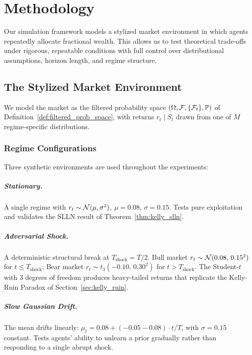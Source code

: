 \chapter{Methodology}
\label{ch:methodology}

Our simulation framework models a stylized market environment in which agents
repeatedly allocate fractional wealth.  This allows us to test theoretical
trade-offs under rigorous, repeatable conditions with full control over
distributional assumptions, horizon length, and regime structure.

\section{The Stylized Market Environment}

We model the market as the filtered probability space
$(\Omega,\mathcal{F},\{\mathcal{F}_t\},\mathbb{P})$ of Definition~\ref{def:filtered_prob_space},
with returns $r_t \mid S_t$ drawn from one of $M$ regime-specific distributions.

\subsection{Regime Configurations}

Three synthetic environments are used throughout the experiments:

\paragraph{Stationary.}
A single regime with $r_t \sim \mathcal{N}(\mu,\sigma^2)$, $\mu=0.08$,
$\sigma=0.15$.  Tests pure exploitation and validates the SLLN result of
Theorem~\ref{thm:kelly_slln}.

\paragraph{Adversarial Shock.}
A deterministic structural break at $T_{\text{shock}} = T/2$.  Bull market
$r_t \sim \mathcal{N}(0.08,\,0.15^2)$ for $t \leq T_{\text{shock}}$; Bear market
$r_t \sim t_3(-0.10,\,0.30^2)$ for $t > T_{\text{shock}}$.  The Student-$t$
with 3 degrees of freedom produces heavy-tailed returns that replicate the
Kelly-Ruin Paradox of Section~\ref{sec:kelly_ruin}.

\paragraph{Slow Gaussian Drift.}
The mean drifts linearly: $\mu_t = 0.08 + (-0.05 - 0.08)\cdot t/T$, with
$\sigma=0.15$ constant.  Tests agents' ability to unlearn a prior gradually
rather than responding to a single abrupt shock.

